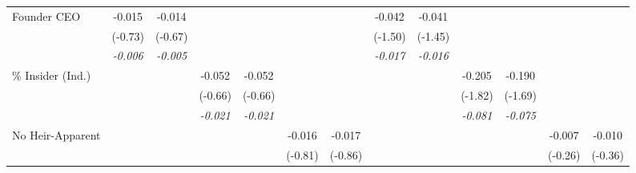{\begin{tabular}{l*{12}{c}}
\midrule Founder CEO  &      -0.015         &      -0.014         &                     &                     &                     &                     &      -0.042         &      -0.041         &                     &                     &                     &                     \\
                    &     (-0.73)         &     (-0.67)         &                     &                     &                     &                     &     (-1.50)         &     (-1.45)         &                     &                     &                     &                     \\
                    &\textit{-0.006}         &\textit{-0.005}         &                     &                     &                     &                     &\textit{-0.017}         &\textit{-0.016}         &                     &                     &                     &                     \\
\% Insider (Ind.)   &                     &                     &      -0.052         &      -0.052         &                     &                     &                     &                     &      -0.205\sym{*}  &      -0.190\sym{*}  &                     &                     \\
                    &                     &                     &     (-0.66)         &     (-0.66)         &                     &                     &                     &                     &     (-1.82)         &     (-1.69)         &                     &                     \\
                    &                     &                     &\textit{-0.021}         &\textit{-0.021}         &                     &                     &                     &                     &\textit{-0.081}         &\textit{-0.075}         &                     &                     \\
No Heir-Apparent  &                     &                     &                     &                     &      -0.016         &      -0.017         &                     &                     &                     &                     &      -0.007         &      -0.010         \\
                    &                     &                     &                     &                     &     (-0.81)         &     (-0.86)         &                     &                     &                     &                     &     (-0.26)         &     (-0.36)         \\

\end{tabular}}
